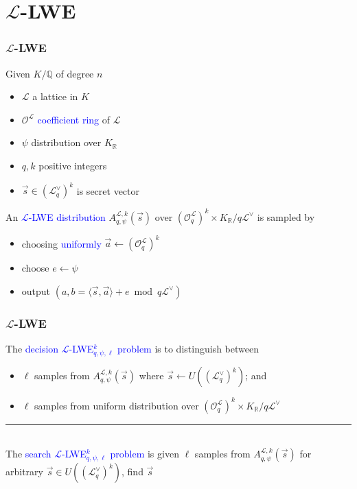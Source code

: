 \documentclass{beamer}
\newcommand{\blue}[1]{\textcolor{blue}{#1}}
\newcommand{\dgreen}[1]{\textcolor{dgreen}{#1}}
\newcommand{\cL}{\mathcal{L}}
\newcommand{\cO}{\mathcal{O}}
\newcommand{\bbQ}{\mathbb{Q}}
\newcommand{\bbR}{\mathbb{R}}
\newcommand{\cOL}{\mathcal{O}^{\mathcal{L}}}
\newcommand{\cLV}{\mathcal{L}^{\vee}}
\newcommand{\KR}{K_{\mathbb{R}}}
\newcommand{\va}{\vec{a}}
\newcommand{\vs}{\vec{s}}
\newcommand{\divline}{\noindent\rule{6cm}{0.4pt}}
\begin{document}
\section{$\cL$-LWE}
\frame
{
  \frametitle{$\cL$-LWE}
  Given $K/\bbQ$ of degree $n$
  \begin{itemize}
  	\item $\cL$ a lattice in $K$
  	\item $\cOL$ \blue{coefficient ring} of $\cL$
  	\item $\psi$ distribution over $K_{\bbR}$
  	\item $q,k$ positive integers
  	\item $\vs\in(\cLV_q)^k$ is secret vector
  \end{itemize}
  An \blue{$\cL$-LWE distribution} $A_{q,\psi}^{\cL,k}(\vs)$ over $(\cO_q^{\cL})^k\times\KR/q\cLV$ is sampled by
  \begin{itemize}
  	\item choosing \blue{uniformly} $\va\leftarrow(\cO_q^{\cL})^k$
  	\item choose $e\leftarrow\psi$
  	\item output $(a,b=\langle\vs,\va\rangle+e\bmod q\cLV)$
  \end{itemize}

}

\frame
{
  \frametitle{$\cL$-LWE}
  The \blue{decision $\cL$-LWE$_{q,\psi,\ell}^k$ problem} is to distinguish between
  \begin{itemize}
  	\item $\ell$ samples from \dgreen{$A_{q,\psi}^{\cL,k}(\vs)$ where $\vs\leftarrow U((\cLV_q)^k)$}; and
  	\item $\ell$ samples from \dgreen{uniform distribution over $(\cOL_q)^k\times\KR/q\cLV$}
  \end{itemize}

  \divline\\

  The \blue{search $\cL$-LWE$_{q,\psi,\ell}^k$ problem} is given $\ell$ samples from $A_{q,\psi}^{\cL,k}(\vs)$ for \dgreen{arbitrary $\vs\in U((\cLV_q)^k)$}, find $\vs$
}
\end{document}

